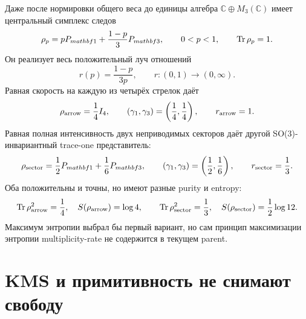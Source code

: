 Даже после нормировки общего веса до единицы алгебра
$\mathbb C\oplus M_3(\mathbb C)$ имеет центральный симплекс следов
\begin{equation}
 \rho_p=pP_{mathbf1}+\frac{1-p}{3}P_{mathbf3},
 \qquad 0<p<1,
 \qquad \operatorname{Tr}\rho_p=1.
 \label{eq:v8-baryon-c0-singlet-triplet-central-trace-simplex}
\end{equation}
Он реализует весь положительный луч отношений
\begin{equation}
 r(p)=\frac{1-p}{3p},
 \qquad r:(0,1)\longrightarrow(0,\infty).
 \label{eq:v8-baryon-c0-central-trace-relative-rate-orbit}
\end{equation}
Равная скорость на каждую из четырёх стрелок даёт
\begin{equation}
 \rho_{\rm arrow}=\frac14I_4,
 \qquad (\gamma_1,\gamma_3)=\left(\frac14,\frac14\right),
 \qquad r_{\rm arrow}=1.
 \label{eq:v8-baryon-c0-equal-per-arrow-rate-witness}
\end{equation}
Равная полная интенсивность двух неприводимых секторов даёт другой
SO(3)-инвариантный trace-one представитель:
\begin{equation}
 \rho_{\rm sector}=\frac12P_{mathbf1}+\frac16P_{mathbf3},
 \qquad (\gamma_1,\gamma_3)=\left(\frac12,\frac16\right),
 \qquad r_{\rm sector}=\frac13.
 \label{eq:v8-baryon-c0-equal-per-sector-rate-witness}
\end{equation}
Оба положительны и точны, но имеют разные purity и entropy:
\begin{equation}
 \operatorname{Tr}\rho_{\rm arrow}^2=\frac14,
 \quad S(\rho_{\rm arrow})=\log4,
 \qquad
 \operatorname{Tr}\rho_{\rm sector}^2=\frac13,
 \quad S(\rho_{\rm sector})=\frac12\log12.
 \label{eq:v8-baryon-c0-two-rate-witness-purity-entropy}
\end{equation}
Максимум энтропии выбрал бы первый вариант, но сам принцип максимизации
энтропии multiplicity-rate не содержится в текущем parent.

\section{KMS и примитивность не снимают свободу}

